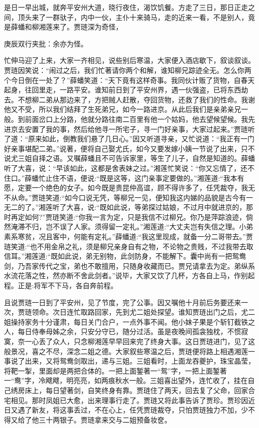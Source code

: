 \begin{parag}
    是日一早出城，就奔平安州大道，晓行夜住，渴饮饥餐。方走了三日，那日正走之间，顶头来了一群驮子，内中一伙，主仆十来骑马，走的近来一看，不是别人，竟是薛蟠和柳湘莲来了。贾琏深为奇怪，\begin{note}庚辰双行夹批：余亦为怪。\end{note}忙伸马迎了上来，大家一齐相见，说些别后寒温，大家便入酒店歇下，叙谈叙谈。贾琏因笑说：“闹过之后，我们忙著请你两个和解，谁知柳兄踪迹全无。怎么你两个今日倒在一处了？”薛蟠笑道：“天下竟有这样奇事。我同伙计贩了货物，自春天起身，往回里走，一路平安。谁知前日到了平安州界，遇一伙强盗，已将东西劫去。不想柳二弟从那边来了，方把贼人赶散，夺回货物，还救了我们的性命。我谢他又不受，所以我们结拜了生死弟兄，如今一路进京。从此后我们是亲弟亲兄一般。到前面岔口上分路，他就分路往南二百里有他一个姑妈，他去望候望候。我先进京去安置了我的事，然后给他寻一所宅子，寻一门好亲事，大家过起来。”贾琏听了道：“原来如此，倒教我们悬了几日心。”因又听道寻亲，又忙说道：“我正有一门好亲事堪配二弟。”说著，便将自己娶尤氏，如今又要发嫁小姨一节说了出来，只不说尤三姐自择之语。又嘱薛蟠且不可告诉家里，等生了儿子，自然是知道的。薛蟠听了大喜，说：“早该如此，这都是舍表妹之过。”湘莲忙笑说：“你又忘情了，还不住口。”薛蟠忙止住不语，便说:“既是这等，这门亲事定要做的。”湘莲道:“我本有愿，定要一个绝色的女子。如今既是贵昆仲高谊，顾不得许多了，任凭裁夺，我无不从命。”贾琏笑道:“如今口说无凭，等柳兄一见，便知我这内娣的品貌是古今有一无二的了。”湘莲听了大喜，说:“既如此说，等弟探过姑娘，不过月中就进京的，那时再定如何?”贾琏笑道:“你我一言为定，只是我信不过柳兄。你乃是萍踪浪迹，倘然淹滞不归，岂不误了人家。须得留一定礼。”湘莲道:“大丈夫岂有失信之理。小弟素系寒贫，况且客中，何能有定礼。”薛蟠道:“我这里现成，就备一分二哥带去。”贾琏笑道:“也不用金帛之礼，须是柳兄亲身自有之物，不论物之贵贱，不过我带去取信耳。”湘莲道:“既如此说，弟无别物，此剑防身，不能解下。囊中尚有一把鸳鸯剑，乃吾家传代之宝，弟也不敢擅用，只随身收藏而已。贾兄请拿去为定。弟纵系水流花落之性，然亦断不舍此剑者。”说毕，大家又饮了几杯，方各自上马，作别起程。正是:将军不下马，各自奔前程。
\end{parag}


\begin{parag}
    且说贾琏一日到了平安州，见了节度，完了公事。因又嘱他十月前后务要还来一次，贾琏领命。次日连忙取路回家，先到尤二姐处探望。谁知贾琏出门之后，尤二姐操持家务十分谨肃，每日关门合户，一点外事不闻。他小妹子果是个斩钉截铁之人，每日侍奉母姊之余，只安分守已，随分过活。虽是夜晚间孤衾独枕，不惯寂寞，奈一心丢了众人，只念柳湘莲早早回来完了终身大事。这日贾琏进门，见了这般景况，喜之不尽，深念二姐之德。大家叙些寒温之后，贾琏便将路上相遇湘莲一事说了出来，又将鸳鸯剑取出，递与三姐。三姐看时，上面龙吞夔护，珠宝晶莹，将靶一掣，里面却是两把合体的。一把上面錾著一“鸳”字，一把上面錾著一“鸯”字，冷飕飕，明亮亮，如两痕秋水一般。三姐喜出望外，连忙收了，挂在自己绣房床上，每日望著剑，自笑终身有靠。贾琏住了两天，回去复了父命，回家合宅相见。那时凤姐已大愈，出来理事行走了。贾琏又将此事告诉了贾珍。贾珍因近日又遇了新友，将这事丢过，不在心上，任凭贾琏裁夺，只怕贾琏独力不加，少不得又给了他三十两银子。贾琏拿来交与二姐预备妆奁。
\end{parag}


